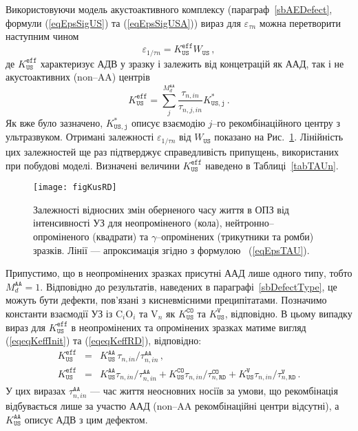 Використовуючи модель акустоактивного комплексу (параграф~\ref{sbAEDefect}, формули (\ref{eqEpsSigUS}) та (\ref{eqEpsSigUSA}))
вираз для $\varepsilon_{\tau n}$ можна перетворити наступним чином
\begin{equation}
\label{eqEpsTAU}
\varepsilon_{1/\tau n}=K_\mathtt{US}^\mathtt{eff}W_\mathtt{US}\,,
\end{equation}
де
$K_\mathtt{US}^\mathtt{eff}$ характеризує АДВ у зразку і залежить від
концетрацій як ААД, так і не акустоактивних (non--AA) центрів
\begin{equation}
\label{eqKeff}
K_\mathtt{US}^\mathtt{eff}=\sum_j^{M_d^\mathtt{AA}}\frac{\tau_{n,in}}{\tau_{n,j,in}}K_\mathtt{US,j}^{*}\,.
\end{equation}
Як вже було зазначено, $K_\mathtt{US,j}^*$ описує взаємодію $j$--го рекомбінаційного центру з ультразвуком.
Отримані залежності $\varepsilon_{1/\tau n}$ від $W_\mathtt{US}$ показано на Рис.~\ref{figKusRD}.
Лінійність цих залежностей ще раз підтверджує справедливість припущень, використаних при побудові
моделі.
Визначені величини $K_\mathtt{US}^\mathtt{eff}$ наведено в Таблиці~\ref{tabTAUn}.


\begin{figure}
\center
\texttt{[image: figKusRD]}
\caption{\label{figKusRD}
Залежності відносних змін оберненого часу життя в ОПЗ від інтенсивності УЗ для
неопроміненого (кола), нейтронно--опроміненого (квадрати) та $\gamma$--опромінених (трикутники та ромби) зразків.
Лінії --- апроксимація згідно з формулою ~(\ref{eqEpsTAU}).
}%
\end{figure}

Припустимо,
що в неопромінених зразках присутні ААД лише одного типу, тобто $M_d^\mathtt{AA}=1$.
Відповідно до результатів, наведених в параграфі~\ref{sbDefectType}, це можуть бути дефекти, пов'язані з кисневмісними преципітатами.
Позначимо константи взаємодії УЗ із C$_i$O$_i$ та V$_n$ як $K_\mathtt{US}^\mathtt{CO}$ та $K_\mathtt{US}^\mathtt{V}$, відповідно.
В цьому випадку вираз для $K_\mathtt{US}^\mathtt{eff}$ в неопромінених та опромінених зразках
матиме вигляд (\ref{eqeqKeffInit}) та (\ref{eqeqKeffRD}), відповідно:
\begin{eqnarray}
K_\mathtt{US}^\mathtt{eff}&=&K_\mathtt{US}^\mathtt{AA}\,\tau_{n,in}/\tau_{n,in}^\mathtt{AA}\,,\label{eqeqKeffInit}\\
K_\mathtt{US}^\mathtt{eff}&=&K_\mathtt{US}^\mathtt{AA}\tau_{n,in}/\tau_{n,in}^\mathtt{AA}+
                           K_\mathtt{US}^\mathtt{CO}\tau_{n,in}/\tau_{n,\mathtt{RD}}^\mathtt{CO}+
                           K_\mathtt{US}^\mathtt{V}\tau_{n,in}/\tau_{n,\mathtt{RD}}^\mathtt{V} \,.\label{eqeqKeffRD}
\end{eqnarray}
У цих виразах $\tau_{n,in}^\mathtt{AA}$ --- час життя неосновних носіїв за умови, що рекомбінація
відбувається лише за участю ААД (non--AA рекомбінаційні центри відсутні),
а $K_\mathtt{US}^\mathtt{AA}$ описує АДВ з цим дефектом.

